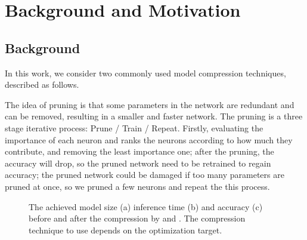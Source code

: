 
\section{Background and Motivation}
\subsection{Background}
In this work, we consider two commonly used model compression techniques, described as follows.

The idea of pruning is that some parameters in the network are redundant and can be removed, resulting in a smaller and faster network. The pruning is a three stage iterative process: Prune / Train / Repeat. Firstly, evaluating the importance of each neuron and ranks the neurons according to how much they contribute, and removing the least importance one; after the pruning, the accuracy will drop, so the pruned network need to be retrained to regain accuracy; the pruned network could be damaged if too many parameters are pruned at once, so we pruned a few neurons and repeat the this process.\\


\begin{figure}[!t]
\centering
{}
\hfill
{}
\hfill
{}
\caption{The achieved model size (a) inference time (b) and accuracy (c) before and after the compression by \quantization and \pruning.
The compression technique to use depends on the optimization target.}
\label{fig:motivation}
\end{figure}

